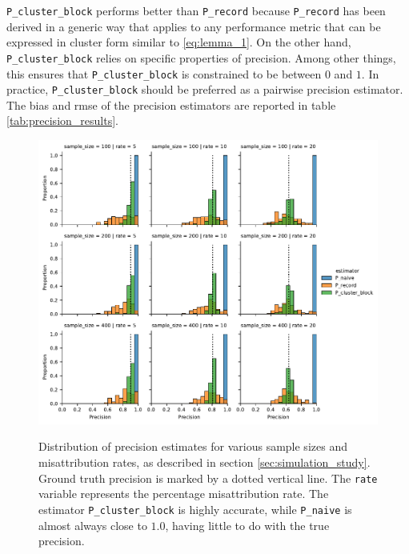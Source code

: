\documentclass[fontsize=11pt]{article}
\theoremstyle{definition}
\begin{document}
\texttt{P\_cluster\_block} performs better than \texttt{P\_record} because \texttt{P\_record} has been derived in a generic way that applies to any performance metric that can be expressed in cluster form similar to \eqref{eq:lemma_1}. On the other hand, \texttt{P\_cluster\_block} relies on specific properties of precision. Among other things, this ensures that \texttt{P\_cluster\_block} is constrained to be between $0$ and $1$. In practice, \texttt{P\_cluster\_block} should be preferred as a pairwise precision estimator. The bias and rmse of the precision estimators are reported in table \ref{tab:precision_results}.

\begin{figure}
    \centering
        \caption{Distribution of precision estimates for various sample sizes and misattribution rates, as described in section \ref{sec:simulation_study}. Ground truth precision is marked by a dotted vertical line. The \texttt{rate} variable represents the percentage misattribution rate. The estimator \texttt{P\_cluster\_block} is highly accurate, while \texttt{P\_naive} is almost always close to $1.0$, having little to do with the true precision.}
    \includegraphics[width=\linewidth]{sim_records_precision}
    \label{fig:sim_records_precision}
\end{figure}
\end{document}
